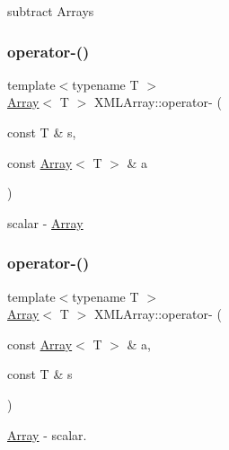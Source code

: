subtract Arrays 

\mbox{\label{namespaceXMLArray_af485f313cac886a054ed3ca2f9507cab}} 
\subsubsection{\texorpdfstring{operator-\/()}{operator-()}\hspace{0.1cm}{\footnotesize\ttfamily [7/8]}}
{\footnotesize\ttfamily template$<$typename T $>$ \\
\mbox{\hyperlink{classXMLArray_1_1Array}{Array}}$<$ T $>$ X\+M\+L\+Array\+::operator-\/ (\begin{DoxyParamCaption}\item[{const T \&}]{s,  }\item[{const \mbox{\hyperlink{classXMLArray_1_1Array}{Array}}$<$ T $>$ \&}]{a }\end{DoxyParamCaption})\hspace{0.3cm}{\ttfamily [inline]}}



scalar -\/ \mbox{\hyperlink{classXMLArray_1_1Array}{Array}} 

\mbox{\label{namespaceXMLArray_acf50974b3d3fee37dd81c3ad47b2715d}} 
\subsubsection{\texorpdfstring{operator-\/()}{operator-()}\hspace{0.1cm}{\footnotesize\ttfamily [8/8]}}
{\footnotesize\ttfamily template$<$typename T $>$ \\
\mbox{\hyperlink{classXMLArray_1_1Array}{Array}}$<$ T $>$ X\+M\+L\+Array\+::operator-\/ (\begin{DoxyParamCaption}\item[{const \mbox{\hyperlink{classXMLArray_1_1Array}{Array}}$<$ T $>$ \&}]{a,  }\item[{const T \&}]{s }\end{DoxyParamCaption})\hspace{0.3cm}{\ttfamily [inline]}}



\mbox{\hyperlink{classXMLArray_1_1Array}{Array}} -\/ scalar. 

